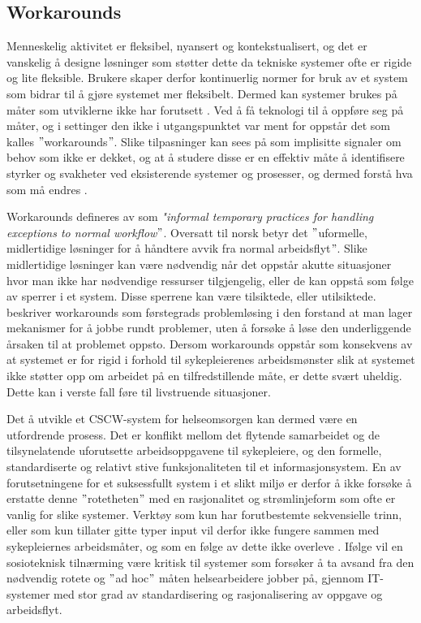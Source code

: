 \subsection{Workarounds}
\label{sec:workarounds}
Menneskelig aktivitet er fleksibel, nyansert og kontekstualisert, og det er vanskelig å designe løsninger som støtter dette da tekniske systemer ofte er rigide og lite fleksible. Brukere skaper derfor kontinuerlig normer for bruk av et system som bidrar til å gjøre systemet mer fleksibelt. Dermed kan systemer brukes på måter som utviklerne ikke har forutsett \citep{Ackermann00}. Ved å få teknologi til å oppføre seg på måter, og i settinger den ikke i utgangspunktet var ment for oppstår det som kalles $"$workarounds$"$. Slike tilpasninger kan sees på som implisitte signaler om behov som ikke er dekket, og at å studere disse er en effektiv måte å identifisere styrker og svakheter ved eksisterende systemer og prosesser, og dermed forstå hva som må endres \citep{Coiera07}. 

\noindent
Workarounds defineres av \citet{Kobayashi05} som \emph{"informal temporary practices for handling exceptions to normal workflow$"$}. Oversatt til norsk betyr det $"$uformelle, midlertidige løsninger for å håndtere avvik fra normal arbeidsflyt$"$. Slike midlertidige løsninger kan være nødvendig når det oppstår akutte situasjoner hvor man ikke har nødvendige ressurser tilgjengelig, eller de kan oppstå som følge av sperrer i et system. Disse sperrene kan være tilsiktede, eller utilsiktede. \citet{Vogelsmeier08} beskriver workarounds som førstegrads problemløsing i den forstand at man lager mekanismer for å jobbe rundt problemer, uten å forsøke å løse den underliggende årsaken til at problemet oppsto. Dersom workarounds oppstår som konsekvens av at systemet er for rigid i forhold til sykepleierenes arbeidsmønster slik at systemet ikke støtter opp om arbeidet på en tilfredstillende måte, er dette svært uheldig. Dette kan i verste fall føre til livstruende situasjoner.

\noindent
Det å utvikle et CSCW-system for helseomsorgen kan dermed være en utfordrende prosess. Det er konflikt mellom det flytende samarbeidet og de tilsynelatende uforutsette arbeidsoppgavene til sykepleiere, og den formelle, standardiserte og relativt stive funksjonaliteten til et informasjonsystem. En av forutsetningene for et suksessfullt system i et slikt miljø er derfor å ikke forsøke å erstatte denne $"$rotetheten$"$ med en rasjonalitet og strømlinjeform som ofte er vanlig for slike systemer. Verktøy som kun har forutbestemte sekvensielle trinn, eller som kun tillater gitte typer input vil derfor ikke fungere sammen med sykepleiernes arbeidsmåter, og som en følge av dette ikke overleve \citep{Berg99}.
Ifølge \citet{Berg99} vil en sosioteknisk tilnærming være kritisk til systemer som forsøker å ta avsand fra den nødvendig rotete og $"$ad hoc$"$ måten helsearbeidere jobber på, gjennom IT-systemer med stor grad av standardisering og rasjonalisering av oppgave og arbeidsflyt.

